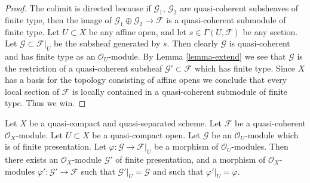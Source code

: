 \begin{proof}
The colimit is directed because if $\mathcal{G}_1$, $\mathcal{G}_2$
are quasi-coherent subsheaves of finite type, then the image of
$\mathcal{G}_1 \oplus \mathcal{G}_2 \to \mathcal{F}$ is
a quasi-coherent submodule of finite type.
Let $U \subset X$ be any affine open, and let
$s \in \Gamma(U, \mathcal{F})$ be any section.
Let $\mathcal{G} \subset \mathcal{F}|_U$ be the
subsheaf generated by $s$. Then clearly $\mathcal{G}$
is quasi-coherent and has finite type as an $\mathcal{O}_U$-module.
By Lemma \ref{lemma-extend} we see that $\mathcal{G}$ is the restriction
of a quasi-coherent subsheaf $\mathcal{G}' \subset \mathcal{F}$
which has finite type. Since $X$ has a basis for the topology consisting
of affine opens we conclude that every local section of
$\mathcal{F}$ is locally contained in a quasi-coherent submodule
of finite type. Thus we win.
\end{proof}

\begin{lemma}
\label{lemma-extend-finite-presentation}
Let $X$ be a quasi-compact and quasi-separated scheme.
Let $\mathcal{F}$ be a quasi-coherent $\mathcal{O}_X$-module.
Let $U \subset X$ be a quasi-compact open.
Let $\mathcal{G}$ be an $\mathcal{O}_U$-module which is of finite presentation.
Let $\varphi : \mathcal{G} \to \mathcal{F}|_U$ be a morphism of
$\mathcal{O}_U$-modules.
Then there exists an $\mathcal{O}_X$-module
$\mathcal{G}'$ of finite presentation, and a morphism
of $\mathcal{O}_X$-modules $\varphi' : \mathcal{G}' \to \mathcal{F}$
such that $\mathcal{G}'|_U = \mathcal{G}$ and such that
$\varphi'|_U = \varphi$.
\end{lemma}

